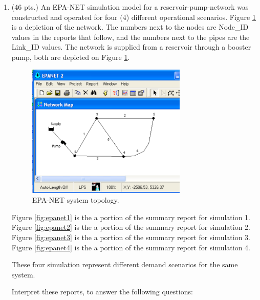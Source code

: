 \documentclass[11pt]{article}
\begin{document}
\begin{enumerate}
\clearpage
\item  (46 pts.)
An EPA-NET simulation model for a reservoir-pump-network was constructed and operated for four (4) different operational scenarios.   Figure \ref{fig:epa-net-map} is a depiction of the network.   The numbers next to the nodes are Node\_ID values in the reports that follow, and the numbers next to the pipes are the Link\_ID values.  The network is supplied from a reservoir through a booster pump, both are depicted on Figure \ref{fig:epa-net-map}. 

\begin{figure}[h!] %
\centering
   \includegraphics[width=3in]{epa-net-map.pdf}
   \caption{EPA-NET system topology.}
   \label{fig:epa-net-map} 
\end{figure}

Figure \ref{fig:epanet1} is the a portion of the summary report for simulation 1.   
Figure \ref{fig:epanet2} is the a portion of the summary report for simulation 2.  
Figure \ref{fig:epanet3} is the a portion of the summary report for simulation 3.  
Figure \ref{fig:epanet4} is the a portion of the summary report for simulation 4.

These four simulation represent different demand scenarios for the same system.



Interpret these reports, to answer the following questions:


\end{enumerate}
\end{document}
